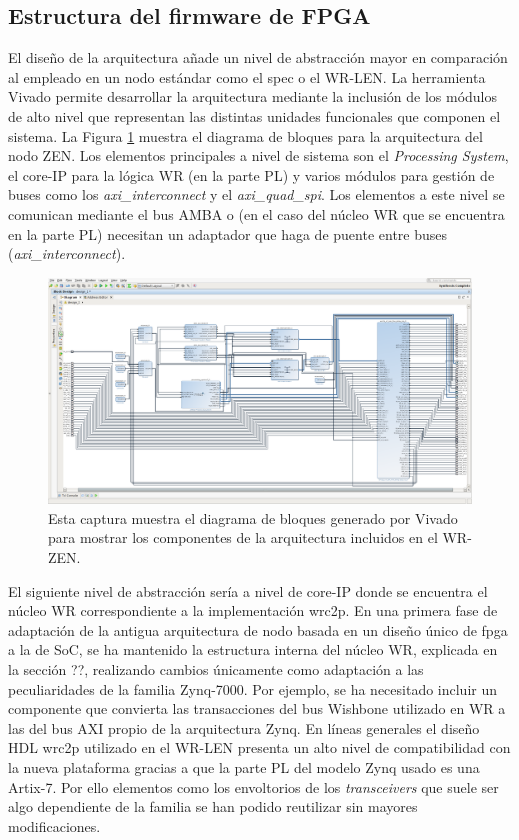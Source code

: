 \subsection{Estructura del firmware de FPGA}

El diseño de la arquitectura añade un nivel de abstracción mayor en comparación 
al empleado en un nodo estándar como el \gls{spec} o el WR-LEN. La herramienta 
Vivado permite desarrollar la arquitectura mediante la inclusión de los módulos 
de alto nivel que representan las distintas unidades funcionales que componen 
el sistema. La Figura \ref*{fig:vivadozen} muestra el diagrama de bloques para 
la arquitectura del nodo ZEN. Los elementos principales a nivel de sistema son 
el \textit{Processing System}, el core-IP para la lógica WR (en la parte PL) y 
varios módulos para gestión de buses como los \textit{axi\_interconnect} y el 
\textit{axi\_quad\_spi}. Los elementos a este nivel se comunican mediante el 
bus 
AMBA o (en el caso del núcleo WR que se encuentra en la parte PL) necesitan un 
adaptador que haga de puente entre buses (\textit{axi\_interconnect}).

\begin{figure}
	\centering
	\includegraphics[width=0.8\linewidth]{imagenes/vivado_zen}
	\caption[Captura de Vivado con el diagrama de bloques de la arquitectura 
	del WR-ZEN]{Esta captura muestra el diagrama de bloques generado por Vivado 
	para mostrar los componentes de la arquitectura incluidos en el WR-ZEN.}
	\label{fig:vivadozen}
\end{figure}

El siguiente nivel de abstracción sería a nivel de core-IP donde se encuentra 
el núcleo WR correspondiente a la implementación \gls{wrc2p}. En una primera 
fase de adaptación de la antigua arquitectura de nodo basada en un diseño único 
de \gls{fpga} a la de SoC, se ha mantenido la estructura interna del núcleo WR, 
explicada en la sección ??, realizando cambios únicamente como adaptación a las 
peculiaridades de la familia Zynq-7000. Por ejemplo, se ha necesitado incluir 
un componente que convierta las transacciones del bus Wishbone utilizado en WR 
a las del bus AXI propio de la arquitectura Zynq. En líneas generales el diseño 
HDL \gls{wrc2p} utilizado en el WR-LEN presenta un alto nivel de compatibilidad 
con la nueva plataforma gracias a que la parte PL del modelo Zynq usado es una 
Artix-7. Por ello elementos como los envoltorios de los \textit{transceivers} 
que suele ser algo dependiente de la familia se han podido reutilizar sin 
mayores modificaciones.

